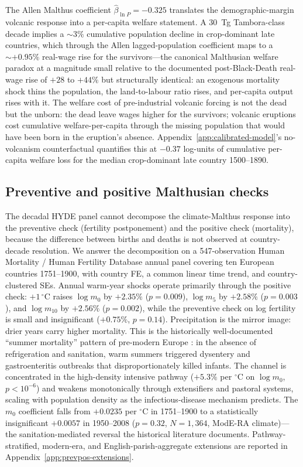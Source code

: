 \documentclass[11pt,letterpaper]{article}
\begin{document}
The Allen Malthus coefficient $\hat\beta_{\ln P} = -0.325$ translates the demographic-margin volcanic response into a per-capita welfare statement. A 30~Tg Tambora-class decade implies a $\sim 3\%$ cumulative population decline in crop-dominant late countries, which through the Allen lagged-population coefficient maps to a $\sim +0.95\%$ real-wage rise for the survivors---the canonical Malthusian welfare paradox at a magnitude small relative to the documented post-Black-Death real-wage rise of $+28$ to $+44\%$ \citep{wrigley1981, clark2007farewell} but structurally identical: an exogenous mortality shock thins the population, the land-to-labour ratio rises, and per-capita output rises with it. The welfare cost of pre-industrial volcanic forcing is not the dead but the unborn: the dead leave wages higher for the survivors; volcanic eruptions cost cumulative welfare-per-capita through the missing population that would have been born in the eruption's absence. Appendix~\ref{app:calibrated-model}'s no-volcanism counterfactual quantifies this at $-0.37$ log-units of cumulative per-capita welfare loss for the median crop-dominant late country 1500--1890.

\subsection{Preventive and positive Malthusian checks}
\label{sec:prevpos}

The decadal HYDE panel cannot decompose the climate-Malthus response into the preventive check (fertility postponement) and the positive check (mortality), because the difference between births and deaths is not observed at country-decade resolution. We answer the decomposition on a 547-observation Human Mortality / Human Fertility Database annual panel covering ten European countries 1751--1900, with country FE, a common linear time trend, and country-clustered SEs. Annual warm-year shocks operate primarily through the positive check: $+1\,^\circ$C raises $\log m_0$ by $+2.35\%$ ($p=0.009$), $\log m_5$ by $+2.58\%$ ($p=0.003$), and $\log m_{10}$ by $+2.56\%$ ($p=0.002$), while the preventive check on log fertility is small and insignificant ($+0.75\%$, $p=0.14$). Precipitation is the mirror image: drier years carry higher mortality. This is the historically well-documented ``summer mortality'' pattern of pre-modern Europe \citep{wrigley1981}: in the absence of refrigeration and sanitation, warm summers triggered dysentery and gastroenteritis outbreaks that disproportionately killed infants. The channel is concentrated in the high-density intensive pathway ($+5.3\%$ per $^\circ$C on $\log m_0$, $p<10^{-6}$) and weakens monotonically through extensifiers and pastoral systems, scaling with population density as the infectious-disease mechanism predicts. The $m_0$ coefficient falls from $+0.0235$ per $^\circ$C in 1751--1900 to a statistically insignificant $+0.0057$ in 1950--2008 ($p=0.32$, $N=1{,}364$, ModE-RA climate)---the sanitation-mediated reversal the historical literature documents. Pathway-stratified, modern-era, and English-parish-aggregate extensions are reported in Appendix~\ref{app:prevpos-extensions}.
\end{document}
